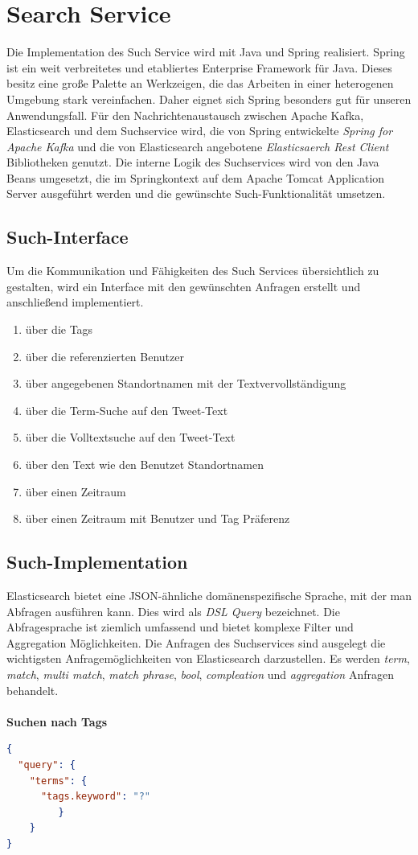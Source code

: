 \section{Search Service}
Die Implementation des Such Service wird mit Java und Spring realisiert. Spring ist ein weit verbreitetes und etabliertes Enterprise Framework für Java. Dieses besitz eine große Palette an Werkzeigen, die das Arbeiten in einer heterogenen Umgebung stark vereinfachen. Daher eignet sich Spring besonders gut für unseren Anwendungsfall. Für den Nachrichtenaustausch zwischen Apache Kafka, Elasticsearch und dem Suchservice wird, die von Spring entwickelte \textit{Spring for Apache Kafka} und die von Elasticsearch angebotene \textit{Elasticsaerch Rest Client} Bibliotheken genutzt.
Die interne Logik des Suchservices wird von den Java Beans umgesetzt, die im Springkontext auf dem Apache Tomcat Application Server ausgeführt werden und die gewünschte Such-Funktionalität umsetzen.

\subsection{Such-Interface}
Um die Kommunikation und Fähigkeiten des Such Services übersichtlich zu gestalten, wird ein Interface mit den gewünschten Anfragen erstellt und anschließend implementiert. 

\begin{enumerate}
	\item über die Tags
	\item über die referenzierten Benutzer
	\item über angegebenen Standortnamen mit der Textvervollständigung
	\item über die Term-Suche auf den Tweet-Text
	\item über die Volltextsuche auf den Tweet-Text
	\item über den Text wie den Benutzet Standortnamen
	\item über einen Zeitraum
	\item über einen Zeitraum mit Benutzer und Tag Präferenz 
\end{enumerate}

\subsection{Such-Implementation}
Elasticsearch bietet eine JSON-ähnliche domänenspezifische Sprache, mit der man Abfragen ausführen kann. Dies wird als \textit{DSL Query} bezeichnet. Die Abfragesprache ist ziemlich umfassend und bietet komplexe Filter und Aggregation Möglichkeiten. Die Anfragen des Suchservices sind ausgelegt die wichtigsten Anfragemöglichkeiten von Elasticsearch darzustellen. Es werden \textit{term}, \textit{match}, \textit{multi match}, \textit{match phrase}, \textit{bool}, \textit{compleation} und \textit{aggregation} Anfragen behandelt. 
\\\\
\textbf{Suchen nach Tags}
\begin{lstlisting}[language=json,firstnumber=1]
{
  "query": {
    "terms": {
      "tags.keyword": "?"
         }
    }
}
\end{lstlisting}

